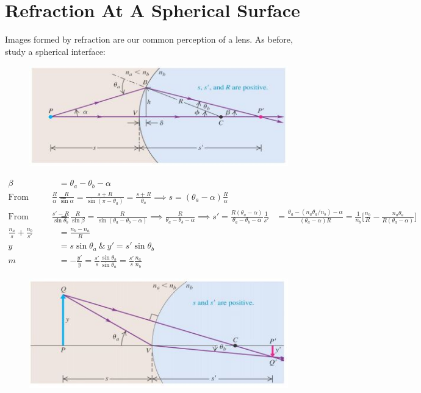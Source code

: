 \documentclass[a4paper, 11pt, normalem]{report}
\begin{document}
\section{Refraction At A Spherical Surface}
Images formed by refraction are our common perception of a lens.
As before, study a spherical interface:
\begin{figure}[H]
    \centering
    \includegraphics{Refrac4.jpg}
\end{figure}
\begin{align}
    \beta &= \theta_{a} - \theta_{b} - \alpha \\
    \text{From PCB: }\frac{R}{\alpha} =& \frac{R}{\sin{\alpha}} = \frac{s + R}{\sin{(\pi - \theta_{a})}} = \frac{s + R}{\theta_{a}} \implies s = (\theta_{a} - \alpha)\frac{R}{\alpha} \\
    \text{From P'CB: }\frac{s' - R}{\sin{\theta_{b}}} &= \frac{R}{\sin{\beta}} = \frac{R}{\sin{(\theta_{a} - \theta_{b} - \alpha)}} \implies \frac{R}{\theta_{a} - \theta_{b} - \alpha} \implies s' = \frac{R(\theta_{a} - \alpha)}{\theta_{a} - \theta_{b} - \alpha}
    \frac{1}{s'} &= \frac{\theta_{a} - (n_{a}\theta_{a}/n_{b}) - \alpha}{(\theta_{a} - \alpha)R} = \frac{1}{n_{b}}\Big[\frac{n_{b}}{R} - \frac{n_{a}\theta_{a}}{R(\theta_{a} - \alpha)}\Big] \\
    \frac{n_{a}}{s} + \frac{n_{b}}{s'} &= \frac{n_{b} - n_{a}}{R} \\
    y &= s\sin{\theta_{a}} ~\&~ y' = s'\sin{\theta_{b}} \\
    m &= -\frac{y'}{y} = \frac{s'}{s}\frac{\sin{\theta_{b}}}{\sin{\theta_{a}}} = \frac{s'}{s}\frac{n_{a}}{n_{b}}
\end{align}
\begin{figure}[H]
    \centering
    \includegraphics{Refrac5.jpg}
\end{figure}
\end{document}

